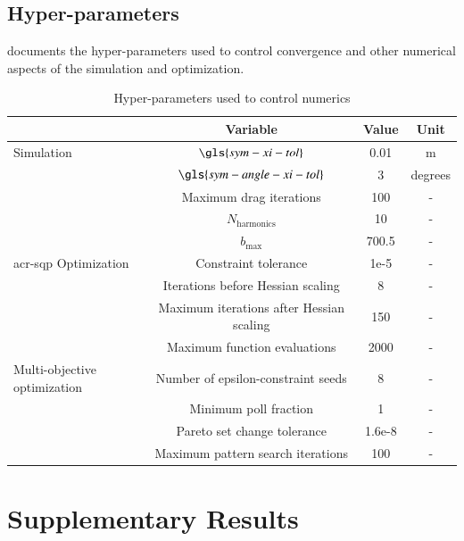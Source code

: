 \subsection{Hyper-parameters}
\label{remdo:sec:appendix-extra-param}
 documents the hyper-parameters used to control convergence and other numerical aspects of the simulation and optimization.
\begin{table}[htbp]
    \centering
    \caption{Hyper-parameters used to control numerics}
    \label{remdo:tab:hyperparams}
\begin{tabular}{lccc} \toprule
          &Variable&  Value& Unit\\ \midrule
          Simulation&$\gls{sym-xi-tol}$&  0.01 & m \\
          &$\gls{sym-angle-xi-tol}$& 3 & degrees\\
          &Maximum drag iterations& 100 & -\\
          &$N_{\text{harmonics}}$& 10 & - \\
          &$b_{\text{max}}$ & 700.5 & - \\ \midrule
          \gls{acr-sqp} Optimization&Constraint tolerance& 1e-5 & - \\
          &Iterations before Hessian scaling& 8 & - \\
  &Maximum iterations after Hessian scaling& 150&-\\
  &Maximum function evaluations& 2000&-\\ \midrule
 Multi-objective optimization& Number of epsilon-constraint seeds& 8&-\\
 & Minimum poll fraction& 1&-\\
 & Pareto set change tolerance& 1.6e-8&-\\
 & Maximum pattern search iterations& 100&-\\\bottomrule
    \end{tabular}
    \end{table}

\section{Supplementary Results}
\label{remdo:sec:appendix-supplemental-results}

